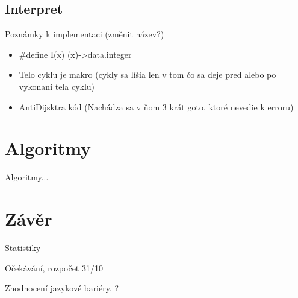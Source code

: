 \documentclass[13pt]{beamer}
\begin{document}
\subsection{Interpret}

\begin{frame}{Poznámky k implementaci (změnit název?)}

  \begin{itemize}
    \item \ttfamily \par\#define I(x) (x)->data.integer
    \item \sffamily Telo cyklu je makro (cykly sa líšia len v tom čo sa deje pred alebo po vykonaní tela cyklu)
    \item AntiDijsktra kód (Nachádza sa v ňom 3 krát goto, ktoré nevedie k erroru)
  \end{itemize}

\end{frame}

\section{Algoritmy}

\begin{frame}{Algoritmy...}
\end{frame}

\section{Závěr}

\begin{frame}{Statistiky}
\end{frame}

\begin{frame}{Očekávání, rozpočet}
31/10
\end{frame}

\begin{frame}{Zhodnocení}
jazykové bariéry, ?
\end{frame}
\end{document}

